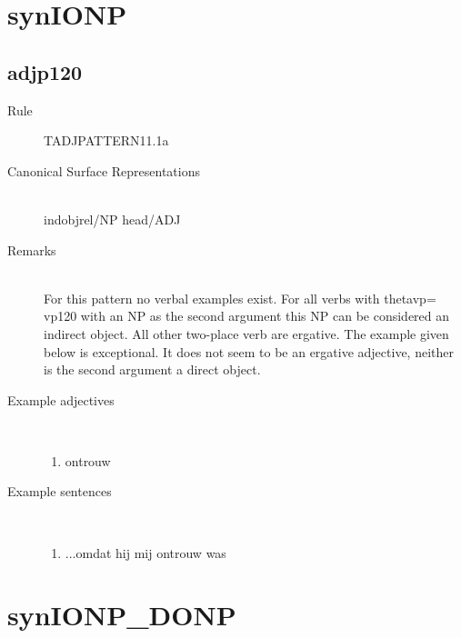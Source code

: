 \newpage
\section{synIONP}
  \subsection{adjp120}
\begin{description}
  \item [Rule] TADJPATTERN11.1a 
  \item [Canonical Surface Representations]  \mbox{}\\ 
indobjrel/NP head/ADJ
  \item [Remarks]  \mbox{}\\ 
For this pattern  no verbal examples exist. For all verbs with thetavp=
vp120 with an NP as the second argument this NP can be considered an indirect 
object. All other two-place verb are ergative. 
The example given below is exceptional. It does not seem to be an ergative 
adjective, neither is the second argument a direct object.

  \item [Example adjectives]\mbox{}\\ 
\begin{enumerate}
  \item ontrouw
\end{enumerate}
  \item [Example sentences]\mbox{}\\
\begin{enumerate}
  \item ...omdat hij mij ontrouw was
\end{enumerate}


\end{description}

\newpage
\section{synIONP\_DONP}
